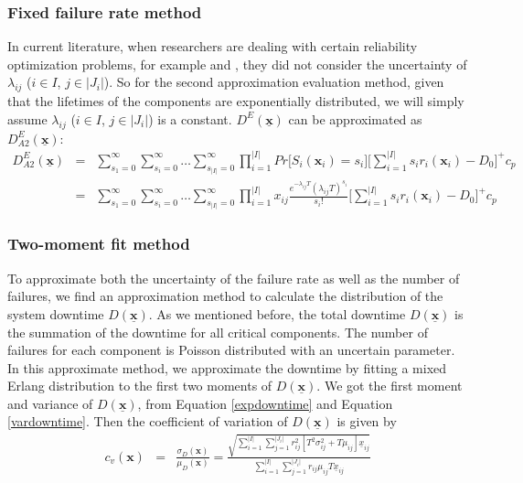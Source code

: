 \documentclass[preprint,12pt]{elsarticle}
\begin{document}
\subsubsection{Fixed failure rate method}
In current literature, when researchers are dealing with certain reliability optimization problems, for example \citet{Mettas} \citet{Oner2010} and \citet{Huang}, they did not consider the uncertainty of $\lambda_{ij}$ ($i \in I$, $j \in \rvert J_{i} \lvert$). So for the second approximation evaluation method, given that the lifetimes of the components are exponentially distributed, we will simply assume $\lambda_{ij}$ ($i \in I$, $j \in \rvert J_{i} \lvert$) is a constant. $D^{E}(\boldsymbol{\underline{x}})$ can be approximated as $D^{E}_{A2}(\boldsymbol{\underline{x}})$:
\small
\begin{eqnarray}
D^{E}_{A2}(\boldsymbol{\underline{x}}) &=&\sum_{s_{1}=0}^{\infty}\sum_{s_{i}=0}^{\infty}\dots\sum_{s_{\rvert I \lvert}=0}^{\infty}{\prod_{i=1}^{\rvert I \lvert} {Pr\bigg[S_{i}(\boldsymbol{x}_{i})=s_{i}\bigg]}} \bigg[\sum_{i=1}^{\rvert I \lvert}{s_{i}r_{i}(\boldsymbol{x}_{i})}-D_{0}\bigg]^{+}c_{p} \nonumber\\
&=& \sum_{s_{1}=0}^{\infty}\sum_{s_{i}=0}^{\infty}\dots\sum_{s_{\rvert I \lvert}=0}^{\infty}{\prod_{i=1}^{\rvert I \lvert} {x_{ij}\frac{e^{-\lambda_{ij}T}(\lambda_{ij}T)^{s_{i}}}{s_{i}!}}}\bigg[\sum_{i=1}^{\rvert I \lvert}{s_{i}r_{i}(\boldsymbol{x}_{i})}-D_{0}\bigg]^{+}c_{p}
\end{eqnarray}
\normalsize

\subsubsection{Two-moment fit method}

To approximate both the uncertainty of the failure rate as well as the number of failures, we find an approximation method to calculate the distribution of the system downtime $D(\underline{\boldsymbol{x}})$. As we mentioned before, the total downtime $D(\underline{\boldsymbol{x}})$ is the summation of the downtime for all critical components. The number of failures for each component is Poisson distributed with an uncertain parameter. In this approximate method, we approximate the downtime by fitting a mixed Erlang distribution to the first two moments of $D(\underline{\boldsymbol{x}})$. We got the first moment and variance of $D(\underline{\boldsymbol{x}})$, from Equation \eqref{expdowntime} and Equation \eqref{vardowntime}. Then the coefficient of variation of $D(\underline{\boldsymbol{x}})$ is given by
\small
\begin{eqnarray}
c_{v}(\boldsymbol{x}) &=& \frac{\sigma_{D}(\boldsymbol{x})}{\mu_{D}(\boldsymbol{x})} = \frac{\sqrt{\sum_{i=1}^{\lvert I \rvert}\sum_{j=1}^{\lvert J_{i} \rvert}r_{ij}^{2}[T^{2}\sigma^{2}_{ij}+T\mu_{ij}]\underline{x}_{ij}}}{\sum^{\lvert I \rvert}_{i=1} \sum_{j=1}^{\lvert J_{i} \rvert}{r_{ij}\mu_{ij}T\underline{x}_{ij}}} \label{cv}
\end{eqnarray}
\end{document}
